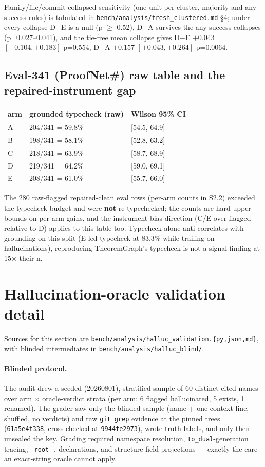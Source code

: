\documentclass[10pt]{article}
\newcommand{\code}[1]{\texttt{#1}}
\begin{document}
Family/file/commit-collapsed sensitivity (one unit per cluster,
majority and any-success rules) is tabulated in
\code{bench/analysis/fresh\_clustered.md} \S 4; under every collapse
D$-$E is a null (p $\geq$ 0.52), D$-$A survives the any-success
collapses (p=0.027--0.041), and the tie-free mean collapse gives D$-$E
$+0.043$ $[-0.104, +0.183]$ p=0.554, D$-$A $+0.157$ $[+0.043, +0.264]$
p=0.0064.

\subsection{Eval-341 (ProofNet\#) raw table and the repaired-instrument
gap}\label{s2:eval}

\begin{center}\footnotesize
\begin{tabular}{@{}lll@{}}
\toprule
arm & grounded typecheck (raw) & Wilson 95\% CI \\
\midrule
A & 204/341 = 59.8\% & [54.5, 64.9] \\
B & 198/341 = 58.1\% & [52.8, 63.2] \\
C & 218/341 = 63.9\% & [58.7, 68.9] \\
D & 219/341 = 64.2\% & [59.0, 69.1] \\
E & 208/341 = 61.0\% & [55.7, 66.0] \\
\bottomrule
\end{tabular}
\end{center}

The 280 raw-flagged repaired-clean eval rows (per-arm counts in S2.2)
exceeded the typecheck budget and were \textbf{not} re-typechecked; the
counts are hard upper bounds on per-arm gains, and the instrument-bias
direction (C/E over-flagged relative to D) applies to this table too.
Typecheck alone anti-correlates with grounding on this split (E led
typecheck at 83.3\% while trailing on hallucinations), reproducing
TheoremGraph's typecheck-is-not-a-signal finding at 15$\times$ their n.

\section{Hallucination-oracle validation detail}\label{s3}

Sources for this section are
\code{bench/analysis/halluc\_validation.\{py,json,md\}}, with blinded
intermediates in \code{bench/analysis/halluc\_blind/}.

\paragraph{Blinded protocol.} The audit drew a seeded (20260801),
stratified sample of 60 distinct cited names over arm $\times$
oracle-verdict strata (per arm: 6 flagged hallucinated, 5 exists, 1
renamed). The grader saw only the blinded sample (name + one context
line, shuffled, no verdicts) and raw \code{git grep} evidence at the
pinned trees (\code{61a5e4f338}, cross-checked at \code{9944fe2973}),
wrote truth labels, and only then unsealed the key. Grading required
namespace resolution, \code{to\_dual}-generation tracing,
\code{\_root\_.} declarations, and structure-field projections ---
exactly the care an exact-string oracle cannot apply.
\end{document}
